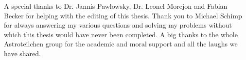A special thanks to Dr. Jannis Pawlowsky, Dr. Leonel Morejon and Fabian Becker for helping with the editing of this thesis. Thank you to Michael Schimp for always answering my various questions and solving my problems without which this thesis would have never been completed. A big thanks to the whole Astroteilchen group for the academic and moral support and all the laughs we have shared. 


